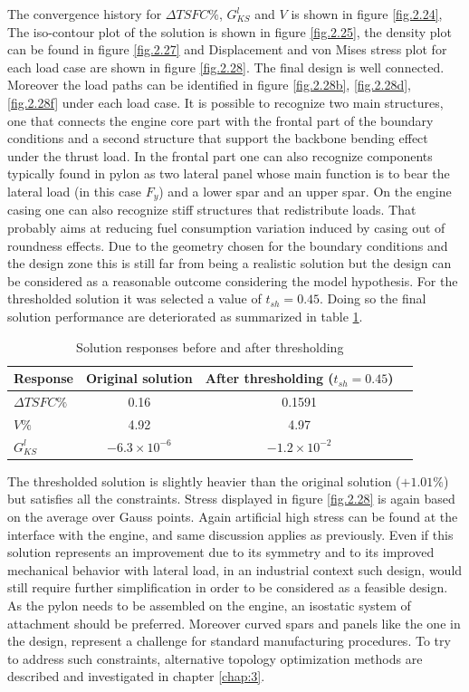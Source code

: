 The convergence history for $\Delta TSFC \%$, $G_{KS}^l$ and $V$ is shown in figure \ref{fig.2.24}, The iso-contour plot of the solution is shown in figure \ref{fig.2.25}, the density plot can be found in figure \ref{fig.2.27} and Displacement and von Mises stress plot for each load case are shown in figure \ref{fig.2.28}. The final design is well connected. Moreover the load paths can be identified in figure \ref{fig.2.28b}, \ref{fig.2.28d}, \ref{fig.2.28f}  under each load case. It is possible to recognize two main structures, one  that connects the engine core part with the frontal part of the boundary conditions and a second structure that support the backbone bending effect under the thrust load. In the frontal part one can also recognize components typically found in pylon as two lateral panel whose main function is to bear the lateral load (in this case $F_y$) and a lower spar and an upper spar. On the engine casing one can also recognize stiff structures that redistribute loads. That probably aims at reducing fuel consumption variation induced by casing out of roundness effects. Due to the geometry chosen for the boundary conditions and the design zone this is still far from being a realistic solution but the design can be considered as a reasonable outcome considering the model hypothesis.  
For the thresholded solution it was selected a value of $t_{sh}=0.45$.
  Doing so the final solution performance are deteriorated as summarized in table \ref{tab:table5}.\\
  \begin{table}[h]
         \caption{\label{tab:table5} Solution responses before and after thresholding }
          \centering
          \begin{tabular}{lccc}
          \hline
           Response& Original solution& After thresholding ($t_{sh}=0.45$) \\\hline
         $\Delta TSFC \%$ & 0.16 & 0.1591 \\
         $V \%$ & 4.92 & 4.97 \\
         $G_{KS}^l$ & $-6.3\times 10^{-6}$ & $-1.2\times 10^{-2}$ \\
          \hline
          \end{tabular}
          \end{table}
          The thresholded solution is slightly heavier than the original solution ($+1.01\%$) but satisfies all the constraints. Stress displayed in figure \ref{fig.2.28} is again based on the average over Gauss points. Again artificial high stress can be found at the interface with the engine, and same discussion applies as previously. Even if this solution represents an improvement due to its symmetry and to its improved mechanical behavior with lateral load, in an industrial context such design, would still require further simplification in order to be considered as a feasible design. As the pylon needs to be assembled on the engine, an isostatic system of attachment should be preferred. Moreover curved spars and panels like the one in the design, represent a challenge for standard manufacturing procedures. To try to address such constraints, alternative topology optimization methods are described and investigated in chapter \ref{chap:3}.
